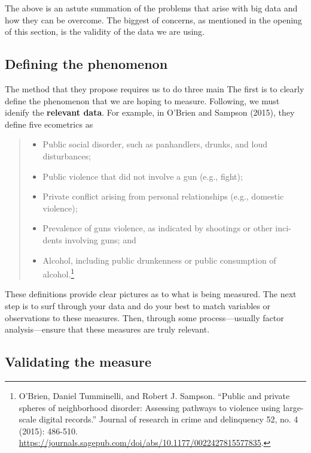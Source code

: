 \documentclass[
]{book}
\providecommand{\tightlist}{%
  \setlength{\itemsep}{0pt}\setlength{\parskip}{0pt}}
\begin{document}
The above is an astute summation of the problems that arise with big data and how they can be overcome. The biggest of concerns, as mentioned in the opening of this section, is the validity of the data we are using.

\hypertarget{defining-the-phenomenon}{%
\subsection{Defining the phenomenon}\label{defining-the-phenomenon}}

The method that they propose requires us to do three main The first is to clearly define the phenomenon that we are hoping to measure. Following, we must idenify the \textbf{relevant data}. For example, in O'Brien and Sampson (2015), they define five ecometrics as

\begin{quote}
\begin{itemize}
\tightlist
\item
  Public social disorder, such as panhandlers, drunks, and loud disturbances;
\item
  Public violence that did not involve a gun (e.g., fight);
\item
  Private conflict arising from personal relationships (e.g., domestic
  violence);
\item
  Prevalence of guns violence, as indicated by shootings or other inci-
  dents involving guns; and
\item
  Alcohol, including public drunkenness or public consumption of
  alcohol.\footnote{O'Brien, Daniel Tumminelli, and Robert J. Sampson. ``Public and private spheres of neighborhood disorder: Assessing pathways to violence using large-scale digital records.'' Journal of research in crime and delinquency 52, no. 4 (2015): 486-510. \url{https://journals.sagepub.com/doi/abs/10.1177/0022427815577835}.}
\end{itemize}
\end{quote}

These definitions provide clear pictures as to what is being measured. The next step is to surf through your data and do your best to match variables or observations to these measures. Then, through some process---usually factor analysis---ensure that these measures are truly relevant.

\hypertarget{validating-the-measure}{%
\subsection{Validating the measure}\label{validating-the-measure}}
\end{document}

